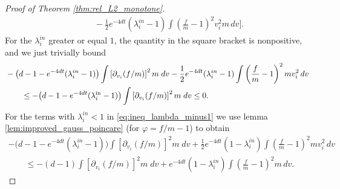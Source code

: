 \documentclass[11pt]{amsart}
\numberwithin{equation}{section}
\begin{document}
\begin{proof}[Proof of Theorem \ref{thm:rel_L2_monotone}]
\begin{align}
    & \qquad- \frac{1}{2}e^{-4dt}(\lambda_{i}^{in}-1) \int \left( \frac{f}{m}-1\right)^2v_i^2m \,dv\Bigg].\label{eq:ineq_lambda_minus1}
  \end{align}
    For the $\lambda^{in}_i $ greater or equal $1$, the quantity in the square bracket is nonpositive, and we just trivially bound 
\begin{align*}
    &- \big(d-1-e^{-4dt}(\lambda_{i}^{in}-1)\big) \int \left[\partial_{v_{i}}(f/ m )\right]^{2}m\;dv  - \frac{1}{2}e^{-4dt}(\lambda_{i}^{in}-1) \int \left(\frac{f}{m}-1\right)^{2}m v_i^2 \,dv\\
    &\qquad\le - \big(d-1-e^{-4dt}(\lambda_i^{\textnormal{in}}-1)\big) \int \left[\partial_{v_{i}}(f/ m )\right]^{2}m\;dv\le 0.
\end{align*}
  For the terms with  $\lambda^{in}_i<1$ in \eqref{eq:ineq_lambda_minus1} we use lemma \ref{lem:improved_gauss_poincare} (for $ \varphi = f/m-1$) to obtain
  \begin{align*}
    - \big(d-1-e^{-4dt}(\lambda_{i}^{in}-1)\big) \int \left[\partial_{v_{i}}(f/ m )\right]^{2}m\;dv  + \frac{1}{2}e^{-4dt}(1-\lambda_{i}^{in})\int \left( \frac{f}{m}-1\right)^2 mv_i^2\,dv\\
    \qquad\le - (d-1) \int \left[\partial_{v_{i}}(f/ m )\right]^{2}m\;dv+e^{-4dt}(1-\lambda_{i}^{in})\int \left( \frac{f}{m}-1\right)^2 m\,dv.
  \end{align*}


\end{proof}
\end{document}
